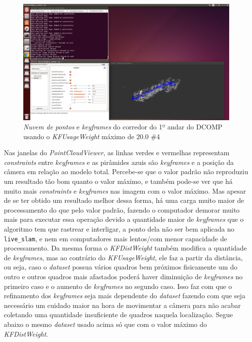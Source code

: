 \begin{figure}[H]
	\centering
		\includegraphics[width= \textwidth]{Imagens/figura3-37.png}
	\caption{\textit{Nuvem de pontos} e \textit{keyframes} do corredor do 1º andar do DCOMP usando o \textit{KFUsageWeight} máximo de 20.0 \#4}
	\label{fig3:35}
\end{figure}


Nas janelas do \textit{PointCloudViewer}, as linhas verdes e vermelhas representam \textit{constraints} entre \textit{keyframes} e as pirâmides azuis são \textit{keyframes} e a posição da câmera em relação ao modelo total. Percebe-se que o valor padrão não reproduziu um resultado tão bom quanto o valor máximo, e também pode-se ver que há muito mais \textit{constraints} e \textit{keyframes} nas imagem com o valor máximo. Mas apesar de se ter obtido um resultado melhor dessa forma, há uma carga muito maior de processamento do que pelo valor padrão, fazendo o computador demorar muito mais para executar essa operação devido a quantidade maior de \textit{keyframes} que o algoritmo tem que rastrear e interligar, a ponto dela não ser bem aplicada no \texttt{live\_slam}, e nem em computadores mais lentos/com menor capacidade de processamento. Da mesma forma o \textit{KFDistWeight} também modifica a quantidade de \textit{keyframes}, mas ao contrário do \textit{KFUsageWeight}, ele faz a partir da distância, ou seja, caso o \textit{dataset} possua vários quadros bem próximos fisicamente um do outro e outros quadros mais afastados poderá haver diminuição de \textit{keyframes} no primeiro caso e o aumento de \textit{keyframes} no segundo caso. Isso faz com que o refinamento dos \textit{keyframes} seja mais dependente do \textit{dataset} fazendo com que seja necessário um cuidado maior na hora de movimentar a câmera para não acabar coletando uma quantidade insuficiente de quadros naquela localização. Segue abaixo o mesmo \textit{dataset} usado acima só que com o valor máximo do \textit{KFDistWeight}.

